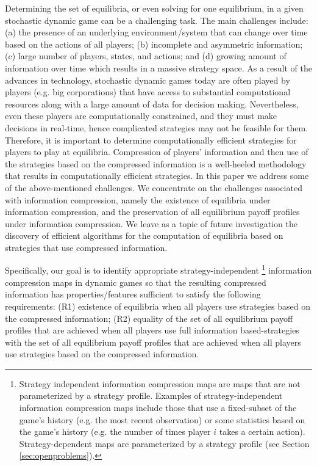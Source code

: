 \documentclass[pdflatex,sn-basic]{sn-jnl}
\theoremstyle{thmstyleone}%
\theoremstyle{thmstyletwo}%
\theoremstyle{thmstylethree}%
\begin{document}
Determining the set of equilibria, or even solving for one equilibrium, in a given stochastic dynamic game can be a challenging task. The main challenges include: (a) the presence of an underlying environment/system that can change over time based on the actions of all players; (b) incomplete and asymmetric information; (c) large number of players, states, and actions; and (d) growing amount of information over time which results in a massive strategy space. {As a result of the advances in} technology, stochastic dynamic games today are often played 
by players (e.g. big corporations) that have access to substantial computational resources along with a large amount of data for decision making. 
{Nevertheless, even these players are computationally constrained}, and they must make decisions in real-time, hence complicated strategies may not be feasible for them. Therefore, it is important to determine computationally efficient strategies for players to play at equilibria. Compression of players' information and then use of the strategies based on the compressed information is a well-heeled methodology that results in computationally efficient strategies. In this paper we address some of the above-mentioned challenges. We concentrate on the challenges associated with information compression, namely the existence of equilibria under information compression, and the preservation of all equilibrium payoff profiles under information compression. We leave as a topic of future investigation the discovery of efficient algorithms for the computation of equilibria based on strategies that use compressed information.

{Specifically, our} goal is to identify appropriate strategy-independent
\footnote{Strategy independent information compression maps are maps that are not parameterized by a strategy profile. Examples of strategy-independent information compression maps include those that use a fixed-subset of the game's history (e.g. the most recent observation) or some statistics based on the game's history (e.g. the number of times player $i$ takes a certain action). Strategy-dependent maps are parameterized by a strategy profile (see Section \ref{sec:openproblems}).} information compression maps in dynamic games so that the resulting compressed information has properties/features sufficient to satisfy the following requirements: (R1) existence of equilibria when all players use strategies based on the {compressed information}; (R2) equality of the set of all equilibrium payoff profiles that are achieved when all players use full information based-strategies with the set of all equilibrium payoff profiles that are achieved when all players use strategies based on the compressed information.
\end{document}
